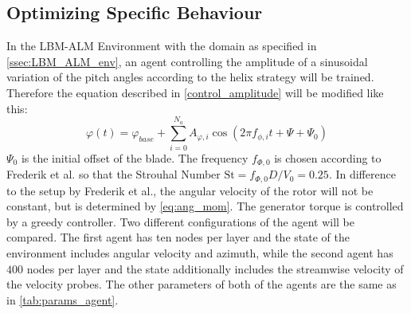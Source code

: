 \subsection{Optimizing Specific Behaviour}
\label{ssec:dyn_description}
In the LBM-ALM Environment with the domain as specified in \autoref{ssec:LBM_ALM_env}, an agent controlling the amplitude of a sinusoidal variation of the pitch angles according to the helix strategy will be trained. Therefore the equation described in \eqref{control_amplitude} will be modified like this:
\begin{equation}
	\varphi(t) = \varphi_{base} + \sum^{N_a}_{i=0} A_{\varphi,i} \cos(2 \pi f_{\phi,i} t + \Psi + \Psi_0)
\end{equation}
$\Psi_0$ is the initial offset of the blade. The frequency $f_{\Phi,0}$ is chosen according to Frederik et al. so that the Strouhal Number $\mathrm{St} = f_{\Phi, 0} D/V_0 = 0.25$. In difference to the setup by Frederik et al., the angular velocity of the rotor will not be constant, but is determined by \eqref{eq:ang_mom}. The generator torque is controlled by a greedy controller. Two different configurations of the agent will be compared. The first agent has ten nodes per layer and the state of the environment includes angular velocity and azimuth, while the second agent has $400$ nodes per layer and the state additionally includes the streamwise velocity of the velocity probes. The other parameters of both of the agents are the same as in \autoref{tab:params_agent}.
